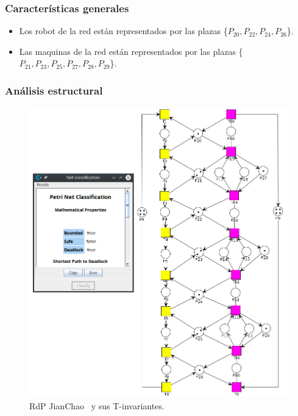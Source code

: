 
\subsubsection{Características generales}
\begin{itemize}
    \item Los robot de la red están representados por las plazas \{$P_{20}, P_{22}, P_{24}, P_{26}$\}.
    \item Las maquinas de la red están representados por las plazas \{$P_{21}, P_{23}, P_{25}, P_{27}, P_{28}, P_{29}$\}.
\end{itemize}

\subsubsection{Análisis estructural}
\hfill
\begin{figure}[H]
	\centering
	\includegraphics[width=\textwidth]{Figures/testing/jianchaodeadlock.png}
	\caption[RdP JianChao y sus T-invariantes.]{RdP JianChao \footnotemark \ y sus T-invariantes.}
	\label{fig:jianchaoinvariantes}
 \end{figure} 

